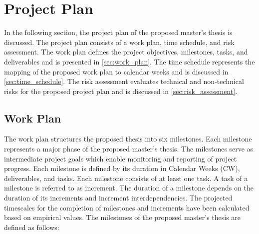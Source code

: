\chapter{Project Plan}
\label{ch:project_plan}
In the following section, the project plan of the proposed master's thesis is discussed.
The project plan consists of a work plan, time schedule, and risk assessment.
The work plan defines the project objectives, milestones, tasks, and deliverables and is presented in \autoref{sec:work_plan}.
The time schedule represents the mapping of the proposed work plan to calendar weeks and is discussed in \autoref{sec:time_schedule}.
The risk assessment evaluates technical and non-technical risks for the proposed project plan and is discussed in \autoref{sec:risk_assessment}.

\section{Work Plan}
\label{sec:work_plan}
The work plan structures the proposed thesis into six milestones.
Each milestone represents a major phase of the proposed master's thesis.
The milestones serve as intermediate project goals which enable monitoring and reporting of project progress.
Each milestone is defined by its duration in Calendar Weeks (CW), deliverables, and tasks.
Each milestone consists of at least one task.
A task of a milestone is referred to as increment.
The duration of a milestone depends on the duration of its increments and increment interdependencies.
The projected timescales for the completion of milestones and increments have been calculated based on empirical values.
The milestones of the proposed master's thesis are defined as follows:
